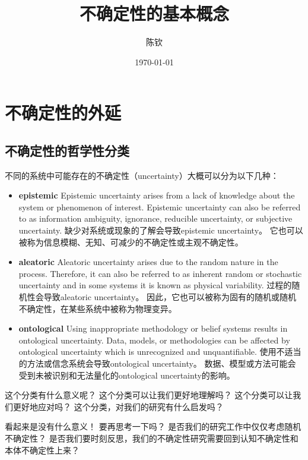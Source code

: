 \documentclass[a4paper]{ctexart}
\title{不确定性的基本概念}
\author{陈钦}
\date{\today}
\begin{document}
\maketitle

\section{不确定性的外延}

\subsection{不确定性的哲学性分类}
不同的系统中可能存在的不确定性（uncertainty）大概可以分为以下几种：

\begin{itemize}
      \item[\textbf{认知}] \textbf{epistemic}
            Epistemic uncertainty arises from a lack of knowledge about the system or phenomenon of interest.
            Epistemic uncertainty can also be referred to as information ambiguity, ignorance, reducible uncertainty, or subjective uncertainty.
            缺少对系统或现象的了解会导致epistemic uncertainty。
            它也可以被称为信息模糊、无知、可减少的不确定性或主观不确定性。
      \item[\textbf{随机}] \textbf{aleatoric}
            Aleatoric uncertainty arises due to the random nature in the process.
            Therefore, it can also be referred to as inherent random or stochastic uncertainty and in some systems it is known as physical variability.
            过程的随机性会导致aleatoric uncertainty。
            因此，它也可以被称为固有的随机或随机不确定性，在某些系统中被称为物理变异。
      \item[\textbf{本体}] \textbf{ontological}
            Using inappropriate methodology or belief systems results in ontological uncertainty.
            Data, models, or methodologies can be affected by ontological uncertainty which is unrecognized and unquantifiable.
            使用不适当的方法或信念系统会导致ontological uncertainty。
            数据、模型或方法可能会受到未被识别和无法量化的ontological uncertainty的影响。
\end{itemize}

这个分类有什么意义呢？
这个分类可以让我们更好地理解吗？
这个分类可以让我们更好地应对吗？
这个分类，对我们的研究有什么启发吗？

看起来是没有什么意义！
要再思考一下吗？
是否我们的研究工作中仅仅考虑随机不确定性？
是否我们要时刻反思，我们的不确定性研究需要回到认知不确定性和本体不确定性上来？
\end{document}
